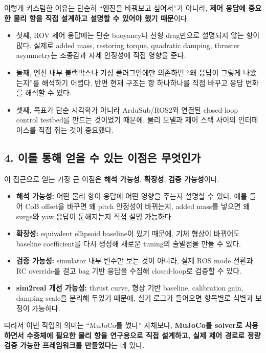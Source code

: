 \documentclass[11pt,a4paper]{article}
\begin{document}
이렇게 커스텀한 이유는 단순히 ``엔진을 바꿔보고 싶어서''가 아니라, \textbf{제어 응답에 중요한 물리 항을 직접 설계하고 설명할 수 있어야 했기 때문}이다.

\begin{itemize}[leftmargin=2em]
  \item 첫째, ROV 제어 응답에는 단순 buoyancy나 선형 drag만으로 설명되지 않는 항이 많다. 실제로 added mass, restoring torque, quadratic damping, thruster asymmetry는 조종감과 자세 안정성에 직접 영향을 준다.
  \item 둘째, 엔진 내부 블랙박스나 기성 플러그인에만 의존하면 ``왜 응답이 그렇게 나왔는지''를 해석하기 어렵다. 반면 현재 구조는 항 하나하나를 직접 바꾸고 응답 변화를 해석할 수 있다.
  \item 셋째, 목표가 단순 시각화가 아니라 ArduSub/ROS2와 연결된 closed-loop control testbed를 만드는 것이었기 때문에, 물리 모델과 제어 스택 사이의 인터페이스를 직접 쥐는 것이 중요했다.
\end{itemize}

\subsection{4. 이를 통해 얻을 수 있는 이점은 무엇인가}

이 접근으로 얻는 가장 큰 이점은 \textbf{해석 가능성}, \textbf{확장성}, \textbf{검증 가능성}이다.

\begin{itemize}[leftmargin=2em]
  \item \textbf{해석 가능성:} 어떤 물리 항이 응답에 어떤 영향을 주는지 설명할 수 있다. 예를 들어 CoB offset을 바꾸면 왜 pitch 안정성이 바뀌는지, added mass를 넣으면 왜 surge와 yaw 응답이 둔해지는지 직접 설명 가능하다.
  \item \textbf{확장성:} equivalent ellipsoid baseline이 있기 때문에, 기체 형상이 바뀌어도 baseline coefficient를 다시 생성해 새로운 tuning의 출발점을 만들 수 있다.
  \item \textbf{검증 가능성:} simulator 내부 변수만 보는 것이 아니라, 실제 ROS mode 전환과 RC override를 걸고 bag 기반 응답을 수집해 closed-loop로 검증할 수 있다.
  \item \textbf{sim2real 개선 가능성:} thrust curve, 형상 기반 baseline, calibration gain, damping scale을 분리해 두었기 때문에, 실기 로그가 들어오면 항목별로 식별과 보정이 가능하다.
\end{itemize}

따라서 이번 작업의 의미는 ``MuJoCo를 썼다'' 자체보다, \textbf{MuJoCo를 solver로 사용하면서 수중체에 필요한 물리 항을 연구용으로 직접 설계하고, 실제 제어 경로로 정량 검증 가능한 프레임워크를 만들었다}는 데 있다.
\end{document}
